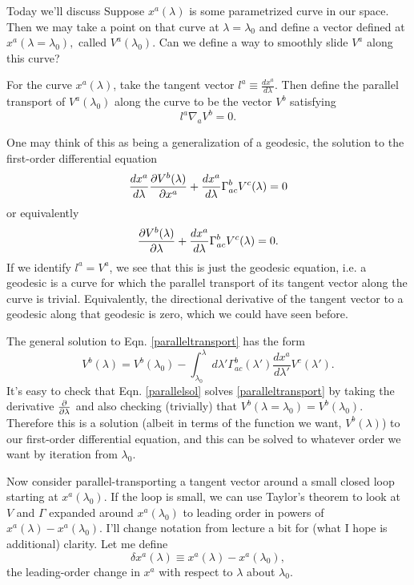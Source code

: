 Today we'll discuss  Suppose $x^a(\lambda)$ is some parametrized curve in our space. Then we may take a point on that curve at $\lambda=\lambda_0$ and define a vector defined at $x^a(\lambda=\lambda_0),$ called $V^a(\lambda_0)$. Can we define a way to smoothly slide $V^a$ along this curve?

For the curve $x^a(\lambda)$, take the tangent vector $l^a\equiv \frac{dx^a}{d\lambda}.$ Then define the parallel transport of $V^a(\lambda_0)$ along the curve to be the vector $V^b$ satisfying
\begin{equation}
    l^a \nabla_a V^b=0.
\end{equation}

One may think of this as being a generalization of a geodesic, the solution to the first-order differential equation
\begin{equation}\label{paralleltransportorig}
\frac{dx^a}{d\lambda}\frac{\p V^b(\lambda)}{\p x^a}+\frac{dx^a}{d\lambda}\Gamma^b_{ac}V^c(\lambda)=0
\end{equation}
or equivalently
\begin{equation}\label{paralleltransport}
\frac{\p V^b(\lambda)}{\p \lambda}+\frac{dx^a}{d\lambda}\Gamma^b_{ac}V^c(\lambda)=0.
\end{equation}
If we identify $l^a=V^a$, we see that this is just the geodesic equation, i.e. a geodesic is a curve for which the parallel transport of its tangent vector along the curve is trivial. Equivalently, the directional derivative of the tangent vector to a geodesic along that geodesic is zero, which we could have seen before.

The general solution to Eqn. \eqref{paralleltransport} has the form
\begin{equation}\label{parallelsol}
V^b(\lambda)=V^b(\lambda_0)-\int_{\lambda_0}^\lambda d\lambda' \Gamma^b_{ac}(\lambda') \frac{dx^a}{d\lambda'}V^c(\lambda').
\end{equation}
It's easy to check that Eqn. \eqref{parallelsol} solves \eqref{paralleltransport} by taking the derivative $\P{}{\lambda}$ and also checking (trivially) that $V^b(\lambda=\lambda_0)=V^b(\lambda_0)$. Therefore this is a solution (albeit in terms of the function we want, $V^b(\lambda)$) to our first-order differential equation, and this can be solved to whatever order we want by iteration from $\lambda_0.$

Now consider parallel-transporting a tangent vector around a small closed loop starting at $x^a(\lambda_0)$. If the loop is small, we can use Taylor's theorem to look at $V$ and $\Gamma$ expanded around $x^a(\lambda_0)$ to leading order in powers of $x^a(\lambda)-x^a(\lambda_0)$. I'll change notation from lecture a bit for (what I hope is additional) clarity. Let me define
$$\delta x^a(\lambda) \equiv x^a(\lambda)-x^a(\lambda_0),$$
the leading-order change in $x^a$ with respect to $\lambda$ about $\lambda_0.$

